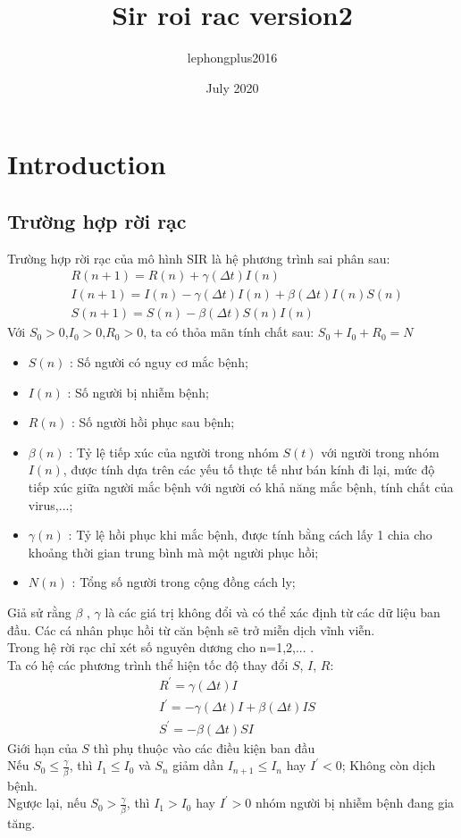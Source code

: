 \documentclass[a4paper]{article}
\title{Sir roi rac version2}
\author{lephongplus2016 }
\date{July 2020}
\begin{document}
\maketitle

\section{Introduction}
\subsection{Trường hợp rời rạc} Trường hợp rời rạc của mô hình SIR là hệ phương trình sai phân sau:
\begin{align*} 
    &R(n+1) 	= R(n) + \gamma (\Delta t) I(n)  \\
	&I(n+1) 	= I(n) - \gamma (\Delta t) I(n) + \beta (\Delta t) I(n)S(n)   \\
	&S(n+1) 	= S(n) - \beta (\Delta t) S(n)I(n)  \label{eq3}
	\end{align*}
	Với $ S_{0}>0 $,$ I_{0}>0 $,$ R_{0}>0 $, ta có thỏa mãn tính chất sau: 
	$ S_{0} + I_{0} + R_{0} = N $ \\
		\begin{itemize}
	\item $S(n)$ : Số người có nguy cơ mắc bệnh;
	\item $I(n)$ : Số người bị nhiễm bệnh;
	\item $R(n)$ : Số người hồi phục sau bệnh;
	\item $\beta(n)$ : Tỷ lệ tiếp xúc của người trong nhóm $S(t)$ với người trong nhóm $I(n)$, được tính dựa trên các yếu tố thực tế như bán kính đi lại, mức độ tiếp xúc giữa người mắc bệnh với người có khả năng mắc bệnh, tính chất của virus,...;
	\item $\gamma(n)$ : Tỷ lệ hồi phục khi mắc bệnh, được tính bằng cách lấy 1 chia cho khoảng thời gian trung bình mà một người phục hồi;
	\item $N(n)$ : Tổng số người trong cộng đồng cách ly;
	\end{itemize}
	Giả sử rằng $\beta$ , $\gamma$ là các giá trị không đổi và có thể xác định từ các dữ liệu ban đầu. Các cá nhân phục hồi từ căn bệnh sẽ trở miễn dịch vĩnh viễn.\\
	Trong hệ rời rạc chỉ xét số nguyên dương cho n=1,2,... .\\
	
	
	Ta có hệ các phương trình thể hiện tốc độ thay đổi $ S$,   $I $, $ R$:
	\begin{align*} 
    &R^{'} 	= \gamma (\Delta t) I  \\
	&I^{'} 	= - \gamma (\Delta t) I + \beta (\Delta t) IS   \\
	&S^{'} 	= - \beta (\Delta t) SI  \label{eq3}
	\end{align*}
    Giới hạn của $S$ thì phụ thuộc vào các điều kiện ban đầu\\ Nếu $S_{0} \leq \frac{\gamma}{\beta} $, thì $I_{1} \leq I_{0}$ và $S_{n}$ giảm dần $I_{n+1} \leq I_{n}$ hay $I^{'}<0$; Không còn dịch bệnh.\\
	Ngược lại, nếu $S_{0} > \frac{\gamma}{\beta} $, thì $I_{1} > I_{0}$ hay $I^{'}>0$ nhóm người bị nhiễm bệnh đang gia tăng.\\
\end{document}
